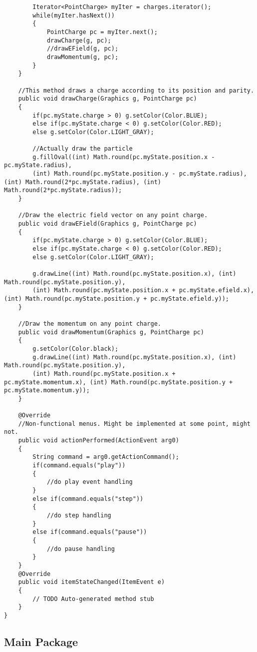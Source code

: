 \documentclass[10pt]{article}
\begin{document}
\begin{verbatim}
		Iterator<PointCharge> myIter = charges.iterator();
		while(myIter.hasNext())
		{
			PointCharge pc = myIter.next();
			drawCharge(g, pc);
			//drawEField(g, pc);
			drawMomentum(g, pc);
		}
	}
	
	//This method draws a charge according to its position and parity.
	public void drawCharge(Graphics g, PointCharge pc)
	{
		if(pc.myState.charge > 0) g.setColor(Color.BLUE);
		else if(pc.myState.charge < 0) g.setColor(Color.RED);
		else g.setColor(Color.LIGHT_GRAY);
		
		//Actually draw the particle
		g.fillOval((int) Math.round(pc.myState.position.x - pc.myState.radius), 
		(int) Math.round(pc.myState.position.y - pc.myState.radius), (int) Math.round(2*pc.myState.radius), (int) Math.round(2*pc.myState.radius));
	}
	
	//Draw the electric field vector on any point charge.
	public void drawEField(Graphics g, PointCharge pc)
	{
		if(pc.myState.charge > 0) g.setColor(Color.BLUE);
		else if(pc.myState.charge < 0) g.setColor(Color.RED);
		else g.setColor(Color.LIGHT_GRAY);
		
		g.drawLine((int) Math.round(pc.myState.position.x), (int) Math.round(pc.myState.position.y), 
		(int) Math.round(pc.myState.position.x + pc.myState.efield.x), (int) Math.round(pc.myState.position.y + pc.myState.efield.y));
	}
	
	//Draw the momentum on any point charge.
	public void drawMomentum(Graphics g, PointCharge pc)
	{
		g.setColor(Color.black);
		g.drawLine((int) Math.round(pc.myState.position.x), (int) Math.round(pc.myState.position.y), 
		(int) Math.round(pc.myState.position.x + pc.myState.momentum.x), (int) Math.round(pc.myState.position.y + pc.myState.momentum.y));
	}

	@Override
	//Non-functional menus. Might be implemented at some point, might not.
	public void actionPerformed(ActionEvent arg0) 
	{
		String command = arg0.getActionCommand();
		if(command.equals("play"))
		{
			//do play event handling
		}
		else if(command.equals("step"))
		{
			//do step handling
		}
		else if(command.equals("pause"))
		{
			//do pause handling
		}	
	}
	@Override
	public void itemStateChanged(ItemEvent e) 
	{
		// TODO Auto-generated method stub
	}
}

\end{verbatim}
\subsection{Main Package}
\end{document}
